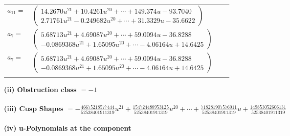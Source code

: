 \documentclass[1p]{elsarticle_modified}
\theoremstyle{definition}
\begin{document}
\begin{tabular}{m{7pt} m{180pt} m{7pt} m{180pt} }
\flushright $a_{11}=$&$\begin{pmatrix}14.2670 u^{21}+10.4261 u^{20}+\cdots+149.374 u-93.7040\\2.71761 u^{21}-0.249682 u^{20}+\cdots+31.3329 u-35.6622\end{pmatrix}$ \\
\flushright $a_{7}=$&$\begin{pmatrix}5.68713 u^{21}+4.69087 u^{20}+\cdots+59.0094 u-36.8288\\-0.0869368 u^{21}+1.65095 u^{20}+\cdots-4.06164 u+14.6425\end{pmatrix}$\\ \flushright $a_{7}=$&$\begin{pmatrix}5.68713 u^{21}+4.69087 u^{20}+\cdots+59.0094 u-36.8288\\-0.0869368 u^{21}+1.65095 u^{20}+\cdots-4.06164 u+14.6425\end{pmatrix}$\\&\end{tabular}
\flushleft \textbf{(ii) Obstruction class $= -1$}\\~\\
\flushleft \textbf{(iii) Cusp Shapes $= -\frac{46675218577444}{52538401911319} u^{21}+\frac{154724488953125}{52538401911319} u^{20}+\cdots+\frac{718281907576011}{52538401911319} u+\frac{149853052606131}{52538401911319}$}\\~\\
\newpage\renewcommand{\arraystretch}{1}
\flushleft \textbf{(iv) u-Polynomials at the component}\newline \\
\end{document}
